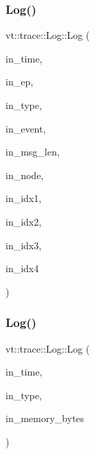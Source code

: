 \mbox{\label{structvt_1_1trace_1_1_log_a33567f4e9e5c0632322e20b30b28d758}} 
\subsubsection{\texorpdfstring{Log()}{Log()}\hspace{0.1cm}{\footnotesize\ttfamily [10/11]}}
{\footnotesize\ttfamily vt\+::trace\+::\+Log\+::\+Log (\begin{DoxyParamCaption}\item[{\hyperlink{namespacevt_a2b9f28078dc309ad0706b69ded743e69}{Time\+Type}}]{in\+\_\+time,  }\item[{\hyperlink{namespacevt_1_1trace_a3c14050715ba9eceaeff51fb3de64f2f}{Trace\+Entry\+I\+D\+Type}}]{in\+\_\+ep,  }\item[{\hyperlink{namespacevt_1_1trace_acf454dfbd581b0ebae895f90b5927a1d}{Trace\+Constants\+Type}}]{in\+\_\+type,  }\item[{\hyperlink{namespacevt_1_1trace_a64a7185f3e102df8d8258f263ccd1582}{Trace\+Event\+I\+D\+Type}}]{in\+\_\+event,  }\item[{\hyperlink{namespacevt_1_1trace_aeb598f45d67d41db7902e494f2f0ce59}{Trace\+Msg\+Len\+Type}}]{in\+\_\+msg\+\_\+len,  }\item[{\hyperlink{namespacevt_a866da9d0efc19c0a1ce79e9e492f47e2}{Node\+Type}}]{in\+\_\+node,  }\item[{uint64\+\_\+t}]{in\+\_\+idx1,  }\item[{uint64\+\_\+t}]{in\+\_\+idx2,  }\item[{uint64\+\_\+t}]{in\+\_\+idx3,  }\item[{uint64\+\_\+t}]{in\+\_\+idx4 }\end{DoxyParamCaption})\hspace{0.3cm}{\ttfamily [inline]}}

\mbox{\label{structvt_1_1trace_1_1_log_aeb68eef0ad06908635851378e2590b66}} 
\subsubsection{\texorpdfstring{Log()}{Log()}\hspace{0.1cm}{\footnotesize\ttfamily [11/11]}}
{\footnotesize\ttfamily vt\+::trace\+::\+Log\+::\+Log (\begin{DoxyParamCaption}\item[{\hyperlink{namespacevt_a2b9f28078dc309ad0706b69ded743e69}{Time\+Type}}]{in\+\_\+time,  }\item[{\hyperlink{namespacevt_1_1trace_acf454dfbd581b0ebae895f90b5927a1d}{Trace\+Constants\+Type}}]{in\+\_\+type,  }\item[{std\+::size\+\_\+t}]{in\+\_\+memory\+\_\+bytes }\end{DoxyParamCaption})\hspace{0.3cm}{\ttfamily [inline]}}



